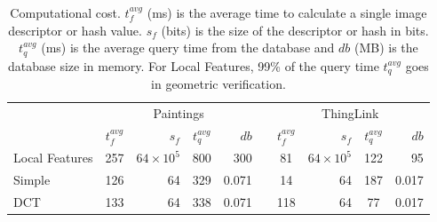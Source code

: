 \documentclass[english,12pt,a4paper,pdftex,elec,utf8, table]{aaltothesis}
\begin{document}
\begin{table} \footnotesize
  \caption{Computational cost. $t_f^{avg}$ (ms) is the average time to calculate a single image descriptor or hash value. $s_f$ (bits) is the size of the descriptor or hash in bits. $t_q^{avg}$ (ms) is the average query time from the database and $db$ (MB) is the database size in memory. For Local Features, 99\% of the query time $t_q^{avg}$ goes in geometric verification.}
\label{computationalcost}
\begin{center}
  \setlength\tabcolsep{3pt} %
  \begin{tabular}{@{}lcrcrrcrcr@{}}
    \toprule
    & \multicolumn{4}{c}{Paintings} &\phantom{abc} &\multicolumn{4}{c}{ThingLink}\\
\cmidrule{2-6} \cmidrule{7-10}
  & $t_f^{avg} $&  $s_f$ & $t_q^{avg}$& $db$ &\phantom{abc} & $t_f^{avg} $&  $s_f$& $t_q^{avg}$& $db$\\ \midrule
    Local Features & 257 & $64 \times 10^5$ & 800 & 300&\phantom{abc} & 81 & $64 \times 10^5$& 122 &95\\
    Simple & 126 & 64 & 329 & 0.071 &\phantom{abc} & 14 & 64 & 187 & 0.017\\
    DCT   & 133 & 64 & 338 & 0.071 & \phantom{abc} & 118 & 64 & 77 & 0.017\\
 \bottomrule
\end{tabular}
\end{center}\end{table}
\end{document}
